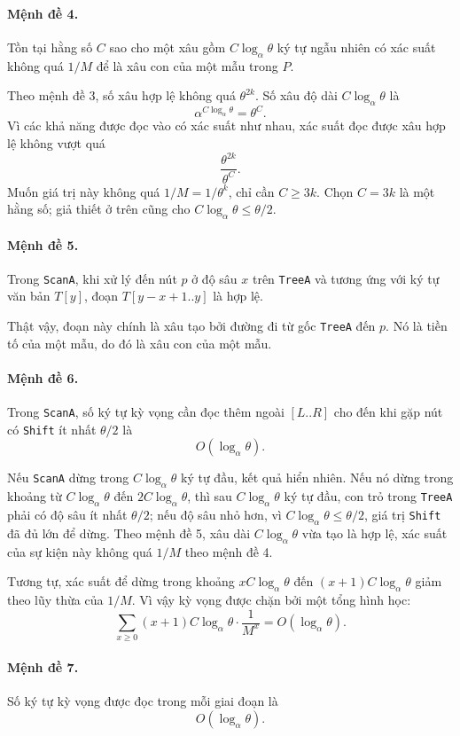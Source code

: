 \documentclass[11pt]{article}
\begin{document}
\paragraph{Mệnh đề 4.}
Tồn tại hằng số $C$ sao cho một xâu gồm $C\log_\alpha\theta$ ký tự ngẫu nhiên
có xác suất không quá $1/M$ để là xâu con của một mẫu trong $P$.

Theo mệnh đề 3, số xâu hợp lệ không quá $\theta^{2k}$. Số xâu độ dài
$C\log_\alpha\theta$ là
\[
  \alpha^{C\log_\alpha\theta}=\theta^C.
\]
Vì các khả năng được đọc vào có xác suất như nhau, xác suất đọc được xâu hợp
lệ không vượt quá
\[
  \frac{\theta^{2k}}{\theta^C}.
\]
Muốn giá trị này không quá $1/M=1/\theta^k$, chỉ cần $C\ge 3k$. Chọn $C=3k$
là một hằng số; giả thiết ở trên cũng cho
$C\log_\alpha\theta\le\theta/2$.

\paragraph{Mệnh đề 5.}
Trong \texttt{ScanA}, khi xử lý đến nút $p$ ở độ sâu $x$ trên \texttt{TreeA}
và tương ứng với ký tự văn bản $T[y]$, đoạn $T[y-x+1..y]$ là hợp lệ.

Thật vậy, đoạn này chính là xâu tạo bởi đường đi từ gốc \texttt{TreeA} đến
$p$. Nó là tiền tố của một mẫu, do đó là xâu con của một mẫu.

\paragraph{Mệnh đề 6.}
Trong \texttt{ScanA}, số ký tự kỳ vọng cần đọc thêm ngoài $[L..R]$ cho đến khi
gặp nút có \texttt{Shift} ít nhất $\theta/2$ là
\[
  O(\log_\alpha\theta).
\]

Nếu \texttt{ScanA} dừng trong $C\log_\alpha\theta$ ký tự đầu, kết quả hiển
nhiên. Nếu nó dừng trong khoảng từ $C\log_\alpha\theta$ đến
$2C\log_\alpha\theta$, thì sau $C\log_\alpha\theta$ ký tự đầu, con trỏ trong
\texttt{TreeA} phải có độ sâu ít nhất $\theta/2$; nếu độ sâu nhỏ hơn, vì
$C\log_\alpha\theta\le\theta/2$, giá trị \texttt{Shift} đã đủ lớn để dừng.
Theo mệnh đề 5, xâu dài $C\log_\alpha\theta$ vừa tạo là hợp lệ, xác suất của
sự kiện này không quá $1/M$ theo mệnh đề 4.

Tương tự, xác suất để dừng trong khoảng
$xC\log_\alpha\theta$ đến $(x+1)C\log_\alpha\theta$ giảm theo lũy thừa của
$1/M$. Vì vậy kỳ vọng được chặn bởi một tổng hình học:
\[
  \sum_{x\ge 0}
  (x+1)C\log_\alpha\theta\cdot \frac{1}{M^x}
  =O(\log_\alpha\theta).
\]

\paragraph{Mệnh đề 7.}
Số ký tự kỳ vọng được đọc trong mỗi giai đoạn là
\[
  O(\log_\alpha\theta).
\]
\end{document}
